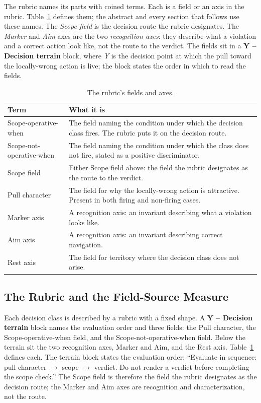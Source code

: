 \documentclass[11pt,a4paper]{article}
\begin{document}
The rubric names its parts with coined terms. Each is a field or an axis in the
rubric. Table~\ref{tab:terms} defines them; the abstract and every section that
follows use these names. The \emph{Scope field} is the decision route the rubric
designates. The \emph{Marker} and \emph{Aim} axes are the two \emph{recognition
axes}: they describe what a violation and a correct action look like, not the
route to the verdict. The fields sit in a \textbf{Y -- Decision terrain} block,
where \emph{Y} is the decision point at which the pull toward the locally-wrong
action is live; the block states the order in which to read the fields.

\begin{table}[h]
\centering
\small
\caption{The rubric's fields and axes.}
\label{tab:terms}
\begin{tabular}{@{}>{\raggedright\arraybackslash}p{3.7cm}>{\raggedright\arraybackslash}p{9.1cm}@{}}
\toprule
Term & What it is \\
\midrule
Scope-operative-when & The field naming the condition under which the decision class fires. The rubric puts it on the decision route. \\
Scope-not-operative-when & The field naming the condition under which the class does not fire, stated as a positive discriminator. \\
Scope field & Either Scope field above: the field the rubric designates as the route to the verdict. \\
Pull character & The field for why the locally-wrong action is attractive. Present in both firing and non-firing cases. \\
Marker axis & A recognition axis: an invariant describing what a violation looks like. \\
Aim axis & A recognition axis: an invariant describing correct navigation. \\
Rest axis & The field for territory where the decision class does not arise. \\
\bottomrule
\end{tabular}
\end{table}

\subsection{The Rubric and the Field-Source Measure}

Each decision class is described by a rubric with a fixed shape. A \textbf{Y --
Decision terrain} block names the evaluation order and three fields: the Pull
character, the Scope-operative-when field, and the Scope-not-operative-when field.
Below the terrain sit the two recognition axes, Marker and Aim, and the Rest axis.
Table~\ref{tab:terms} defines each. The terrain block states the evaluation order:
``Evaluate in sequence: pull character $\rightarrow$ scope $\rightarrow$ verdict.
Do not render a verdict before completing the scope check.'' The Scope field is
therefore the field the rubric designates as the decision route; the Marker and
Aim axes are recognition and characterization, not the route.
\end{document}
